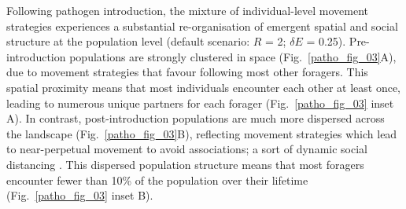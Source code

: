 Following pathogen introduction, the mixture of individual-level movement strategies experiences a substantial re-organisation of emergent spatial and social structure at the population level (default scenario: $R$ = 2; $\delta E$ = 0.25).
Pre-introduction populations are strongly clustered in space (Fig.~\ref{patho_fig_03}A), due to movement strategies that favour following most other foragers.
This spatial proximity means that most individuals encounter each other at least once, leading to numerous unique partners for each forager (Fig.~\ref{patho_fig_03} inset A).
In contrast, post-introduction populations are much more dispersed across the landscape (Fig.~\ref{patho_fig_03}B), reflecting movement strategies which lead to near-perpetual movement to avoid associations; a sort of dynamic social distancing \citep{pusceddu2021}.
This dispersed population structure means that most foragers encounter fewer than 10\% of the population over their lifetime (Fig.~\ref{patho_fig_03} inset B).


